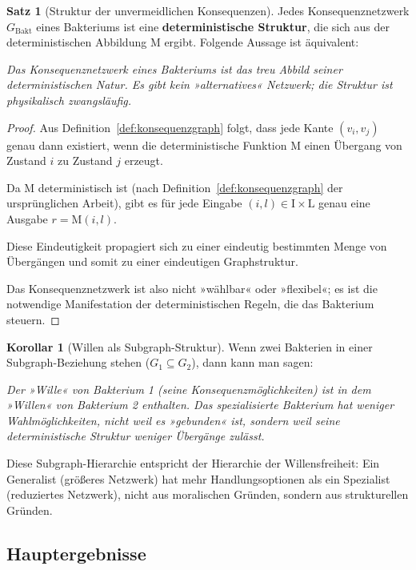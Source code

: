 \documentclass[a4paper,12pt]{article}
\theoremstyle{definition}
\newtheorem{satz}{Satz}
\newtheorem{korollar}{Korollar}
\begin{document}
\begin{satz}[Struktur der unvermeidlichen Konsequenzen]
\label{satz:struktur_konsequenzen}
Jedes Konsequenznetzwerk $G_{\text{Bakt}}$ eines Bakteriums ist eine \textbf{deterministische Struktur}, die sich aus der deterministischen Abbildung $\text{M}$ ergibt. Folgende Aussage ist äquivalent:

\textit{Das Konsequenznetzwerk eines Bakteriums ist das treu Abbild seiner deterministischen Natur. Es gibt kein »alternatives« Netzwerk; die Struktur ist physikalisch zwangsläufig.}
\end{satz}

\begin{proof}
Aus Definition~\ref{def:konsequenzgraph} folgt, dass jede Kante $(v_i, v_j)$ genau dann existiert, wenn die deterministische Funktion $\text{M}$ einen Übergang von Zustand $i$ zu Zustand $j$ erzeugt.

Da $\text{M}$ deterministisch ist (nach Definition~\ref{def:konsequenzgraph} der ursprünglichen Arbeit), gibt es für jede Eingabe $(i, l) \in \text{I} \times \text{L}$ genau eine Ausgabe $r = \text{M}(i, l)$.

Diese Eindeutigkeit propagiert sich zu einer eindeutig bestimmten Menge von Übergängen und somit zu einer eindeutigen Graphstruktur.

Das Konsequenznetzwerk ist also nicht »wählbar« oder »flexibel«; es ist die notwendige Manifestation der deterministischen Regeln, die das Bakterium steuern.
\end{proof}

\begin{korollar}[Willen als Subgraph-Struktur]
\label{kor:willen_subgraph}
Wenn zwei Bakterien in einer Subgraph-Beziehung stehen ($G_1 \subseteq G_2$), dann kann man sagen: 

\textit{Der »Wille« von Bakterium 1 (seine Konsequenzmöglichkeiten) ist in dem »Willen« von Bakterium 2 enthalten. Das spezialisierte Bakterium hat weniger Wahlmöglichkeiten, nicht weil es »gebunden« ist, sondern weil seine deterministische Struktur weniger Übergänge zulässt.}

Diese Subgraph-Hierarchie entspricht der Hierarchie der Willensfreiheit: Ein Generalist (größeres Netzwerk) hat mehr Handlungsoptionen als ein Spezialist (reduziertes Netzwerk), nicht aus moralischen Gründen, sondern aus strukturellen Gründen.
\end{korollar}

\subsection{Hauptergebnisse}
\end{document}
